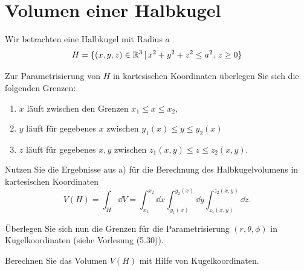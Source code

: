 \documentclass{scrartcl}
\begin{document}
\maketitle


\section{Volumen einer Halbkugel }
\label{sec:volumenintegral_i}

Wir betrachten eine Halbkugel mit Radius $a$ 
\[
  H = \{ (x,y,z) \in \mathbb{R}^3 \, | \, x^2 + y^2 + z^2 \le a^2,\, z \ge 0 \}
\]
\begin{subex}
  \item{} Zur Parametrisierung von $H$ in kartesischen Koordinaten überlegen Sie sich die folgenden Grenzen:
  \begin{enumerate}[label=\roman*)]
    \item $x$ läuft zwischen den Grenzen $x_1 \le x \le x_2$,
    \item $y$ läuft für gegebenes $x$ zwischen $y_1(x) \le y \le y_2(x)$
    \item $z$ läuft für gegebenes $x, y$ zwischen $z_1(x,y) \le z \le z_2(x,y)$.
  \end{enumerate}

  \item{} Nutzen Sie die Ergebnisse aus a) für die Berechnung des Halbkugelvolumens in kartesischen Koordinaten
  \[
    V(H) = \int_H \dd V 
    = \int_{x_1}^{x_2} \dd x \int_{y_1(x)}^{y_2(x)} \dd y \int_{z_1(x,y)}^{z_2(x,y)} \dd z.
  \]

  \item{} Überlegen Sie sich nun die Grenzen für die Parametrisierung $(r,\theta,\phi)$ in Kugelkoordinaten (siehe Vorlesung (5.30)).

  \item{} Berechnen Sie das Volumen $V(H)$ mit Hilfe von Kugelkoordinaten.
\end{subex}
\end{document}
